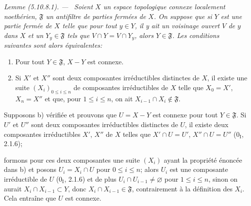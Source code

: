 \documentclass[10pt,oneside]{book}
\newcommand{\oldpage}[2][]{%
  \setcounter{footnote}{0}%
  \marginpar{\scriptsize\textbf{#1}~|~#2}\ignorespaces}
\newenvironment{lemma}[1][]{%
  \par\medskip\noindent\itshape Lemme (#1). ---\ }{\par}
\begin{document}
\begin{lemma}[5.10.8.1]
\label{IV.2.s5.10.8.1-fr}
Soient $X$ un espace topologique connexe localement noethérien,
$\mathfrak F$ un antifiltre de parties fermées de $X$. On suppose que si $Y$
est une partie fermée de $X$ telle que pour tout $y\in Y$, il y ait un
voisinage ouvert $V$ de $y$ dans $X$ et un $Y_y\in\mathfrak F$ tels que
$V\cap Y=V\cap Y_y$, alors $Y\in\mathfrak F$. Les conditions suivantes sont
alors équivalentes:
\begin{enumerate}
\item[a)] Pour tout $Y\in\mathfrak F$, $X-Y$ est connexe.
\item[b)] Si $X'$ et $X''$ sont deux composantes irréductibles distinctes de
$X$, il existe une suite $(X_i)_{0\leq i\leq n}$ de composantes irréductibles
de $X$ telle que $X_0=X'$, $X_n=X''$ et que, pour $1\leq i\leq n$, on ait
$X_{i-1}\cap X_i\notin\mathfrak F$.
\end{enumerate}
\end{lemma}

Supposons b) vérifiée et prouvons que $U=X-Y$ est connexe pour tout
$Y\in\mathfrak F$. Si $U'$ et $U''$ sont deux composantes irréductibles
distinctes de $U$, il existe deux composantes irréductibles $X'$, $X''$ de
$X$ telles que $X'\cap U=U'$, $X''\cap U=U''$ (0$_\mathrm I$, 2.1.6);

\oldpage[IV-2]{117}

formons pour ces deux composantes une suite $(X_i)$ ayant la propriété énoncée
dans b) et posons $U_i=X_i\cap U$ pour $0\leq i\leq n$; alors $U_i$ est une
composante irréductible de $U$ (0$_\mathrm I$, 2.1.6) et de plus
$U_i\cap U_{i-1}\neq\varnothing$ pour $1\leq i\leq n$, sinon on aurait
$X_i\cap X_{i-1}\subset Y$, donc $X_i\cap X_{i-1}\in\mathfrak F$,
contrairement à la définition des $X_i$. Cela entraîne que $U$ est connexe.
\end{document}
